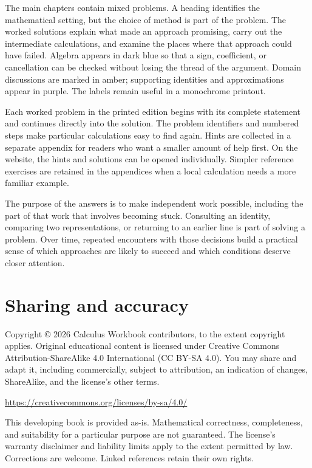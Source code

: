 \documentclass[11pt,oneside,openany]{book}
\begin{document}
The main chapters contain mixed problems. A heading identifies the mathematical
setting, but the choice of method is part of the problem. The worked solutions
explain what made an approach promising, carry out the intermediate calculations,
and examine the places where that approach could have failed. Algebra appears
in dark blue so that a sign, coefficient, or cancellation can be checked without
losing the thread of the argument. Domain discussions are marked in amber;
supporting identities and approximations appear in purple. The labels remain
useful in a monochrome printout.

Each worked problem in the printed edition begins with its complete statement
and continues directly into the solution. The problem identifiers and numbered
steps make particular calculations easy to find again. Hints are collected in
a separate appendix for readers who want a smaller amount of help first. On the
website, the hints and solutions can be opened individually. Simpler reference
exercises are retained in the appendices when a local calculation needs a more
familiar example.

The purpose of the answers is to make independent work possible, including the
part of that work that involves becoming stuck. Consulting an identity, comparing
two representations, or returning to an earlier line is part of solving a
problem. Over time, repeated encounters with those decisions build a practical
sense of which approaches are likely to succeed and which conditions deserve
closer attention.
\chapter*{Sharing and accuracy}
Copyright \copyright{} 2026 Calculus Workbook contributors, to the extent copyright applies. Original educational content is licensed under Creative Commons Attribution-ShareAlike 4.0 International (CC BY-SA 4.0). You may share and adapt it, including commercially, subject to attribution, an indication of changes, ShareAlike, and the license's other terms.

\url{https://creativecommons.org/licenses/by-sa/4.0/}

This developing book is provided as-is. Mathematical correctness, completeness, and suitability for a particular purpose are not guaranteed. The license's warranty disclaimer and liability limits apply to the extent permitted by law. Corrections are welcome. Linked references retain their own rights.

\tableofcontents
\mainmatter
\end{document}
